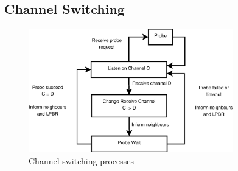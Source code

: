 



\subsection{Channel Switching}



\begin{figure}
\centering
\includegraphics[width=3.5in]{Diagram1.eps}
\caption{Channel switching processes}
\label{fig_sim}
\end{figure}

